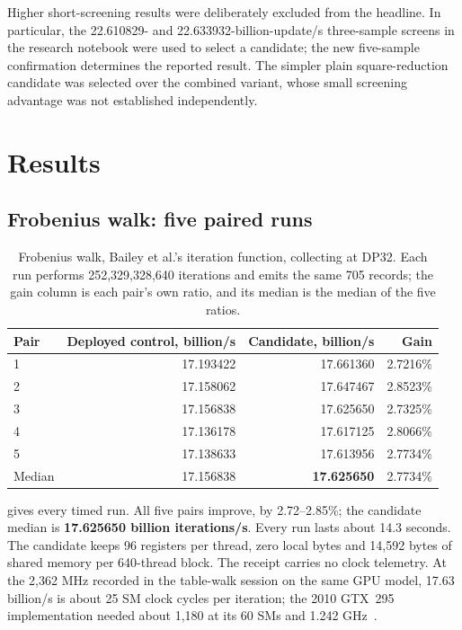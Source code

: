 \documentclass[11pt,a4paper]{article}
\begin{document}
Higher short-screening results were deliberately excluded from the headline. In particular, the 22.610829- and 22.633932-billion-update/s three-sample screens in the research notebook were used to select a candidate; the new five-sample confirmation determines the reported result. The simpler plain square-reduction candidate was selected over the combined variant, whose small screening advantage was not established independently.

\section{Results}\label{sec:results}
\subsection{Frobenius walk: five paired runs}\label{sec:sigmaresults}
\begin{table}[t]
\centering
\begin{tabular}{@{}lrrr@{}}
\toprule
Pair & Deployed control, billion/s & Candidate, billion/s & Gain\\
\midrule
1 & 17.193422 & 17.661360 & 2.7216\%\\
2 & 17.158062 & 17.647467 & 2.8523\%\\
3 & 17.156838 & 17.625650 & 2.7325\%\\
4 & 17.136178 & 17.617125 & 2.8066\%\\
5 & 17.138633 & 17.613956 & 2.7734\%\\
\midrule
Median & 17.156838 & \textbf{17.625650} & 2.7734\%\\
\bottomrule
\end{tabular}
\caption{Frobenius walk, Bailey et al.'s iteration function, collecting at DP32. Each run performs 252,329,328,640 iterations and emits the same 705 records; the gain column is each pair's own ratio, and its median is the median of the five ratios.}
\label{tab:sigma}
\end{table}

 gives every timed run. All five pairs improve, by 2.72--2.85\%; the candidate median is \textbf{17.625650 billion iterations/s}. Every run lasts about 14.3 seconds. The candidate keeps 96 registers per thread, zero local bytes and 14,592 bytes of shared memory per 640-thread block. The receipt carries no clock telemetry. At the 2,362 MHz recorded in the table-walk session on the same GPU model, 17.63 billion/s is about 25 SM clock cycles per iteration; the 2010 GTX~295 implementation needed about 1,180 at its 60 SMs and 1.242 GHz~\cite{bernstein2012}.
\end{document}
